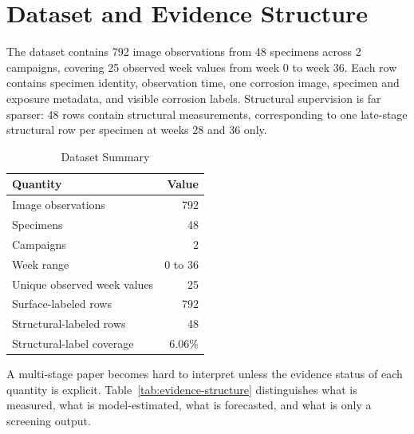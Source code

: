 \documentclass[conference]{IEEEtran}
\begin{document}
\section{Dataset and Evidence Structure}
The dataset contains 792 image observations from 48 specimens across 2 campaigns, covering 25 observed week values from week 0 to week 36. Each row contains specimen identity, observation time, one corrosion image, specimen and exposure metadata, and visible corrosion labels. Structural supervision is far sparser: 48 rows contain structural measurements, corresponding to one late-stage structural row per specimen at weeks 28 and 36 only.

\begin{table}[t]
    \caption{Dataset Summary}
    \label{tab:dataset-summary}
    \centering
    \small
    \begin{tabular}{lr}
        \toprule
        Quantity & Value \\
        \midrule
        Image observations & 792 \\
        Specimens & 48 \\
        Campaigns & 2 \\
        Week range & 0 to 36 \\
        Unique observed week values & 25 \\
        Surface-labeled rows & 792 \\
        Structural-labeled rows & 48 \\
        Structural-label coverage & 6.06\% \\
        \bottomrule
    \end{tabular}
\end{table}

A multi-stage paper becomes hard to interpret unless the evidence status of each quantity is explicit. Table~\ref{tab:evidence-structure} distinguishes what is measured, what is model-estimated, what is forecasted, and what is only a screening output.
\end{document}
